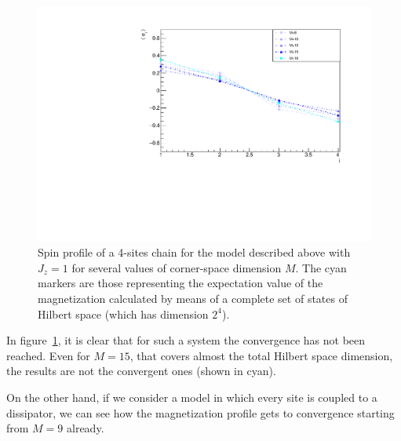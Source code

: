 \begin{figure}[H]
    \centering
    \includegraphics[scale=0.7]{Figures/4sites/4sites_LM_convergenceIncreasingM.pdf}
    \captionsetup{width=1.\linewidth}
    \caption{Spin profile of a 4-sites chain for the model described above with $J_z=1$ for several values of corner-space dimension $M$. The cyan markers are those representing the expectation value of the magnetization calculated by means of a complete set of states of Hilbert space (which has dimension $2^4$).}
    \label{fig:4sites_LM_convergenceIncreasingM}
\end{figure}

In figure~\ref{fig:4sites_LM_convergenceIncreasingM}, it is clear that for such a system the convergence has not been reached. Even for $M = 15$, that covers almost the total Hilbert space dimension, the results are not the convergent ones (shown in cyan).

On the other hand, if we consider a model in which every site is coupled to a dissipator, we can see how the magnetization profile gets to convergence starting from $M = 9$ already.


